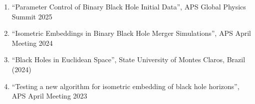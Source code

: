 \begin{enumerate}
		\setlength\itemsep{-0.1cm}
    \item ``Parameter Control of Binary Black Hole Initial Data'', APS Global Physics Summit 2025
    \item ``Isometric Embeddings in Binary Black Hole Merger Simulations'', APS April Meeting 2024
    \item ``Black Holes in Euclidean Space'', State University of Montes Claros, Brazil (2024)
    \item ``Testing a new algorithm for isometric embedding of black hole horizons'', APS April Meeting 2023
\end{enumerate}
